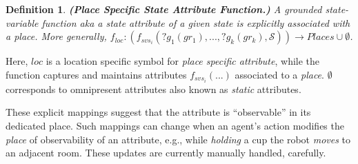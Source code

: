 \documentclass[letterpaper]{article} %
\newtheorem{definition}{Definition}
\begin{document}
\begin{definition} \label{def:pssav}
    \textbf{(Place Specific State Attribute Function.)} A {\em grounded} state-variable function {\em aka} a state attribute of a given state is explicitly associated with a place. More generally, 
    $f_{loc}: (f_{svs_i}(?g_1(gr_1),...,?g_k(gr_k),\mathcal{S})) \rightarrow Places \cup \emptyset$.
\end{definition}
Here, $\mathit{loc}$ is a location specific symbol for {\em place specific attribute}, while the function captures and maintains attributes $f_{svs_i}(...)$ associated to a \textit{place}. $\emptyset$ corresponds to omnipresent attributes also known as \textit{static} attributes.


These explicit mappings suggest that the attribute is ``observable'' in its dedicated place. Such mappings can change when an agent's action modifies the \textit{place} of observability of an attribute, e.g., 
while \textit{holding} a cup the robot \textit{moves} to an adjacent room. 
These updates are currently manually handled, carefully.
\end{document}
